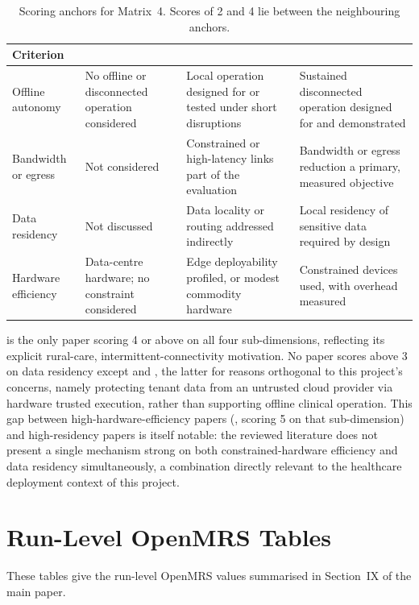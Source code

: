 \documentclass[10pt]{article}
\begin{document}
\begin{table}[t]
\centering
\caption{Scoring anchors for Matrix~4. Scores of 2 and 4 lie between the neighbouring anchors.\label{tab:matrix4-rubric}}
\footnotesize
\setlength{\tabcolsep}{3pt}
\begin{tabular}{@{}>{\RaggedRight\arraybackslash}p{}>{\RaggedRight\arraybackslash}p{}>{\RaggedRight\arraybackslash}p{}>{\RaggedRight\arraybackslash}p{}@{}}
\toprule
Criterion & 1 & 3 & 5 \\
\midrule
Offline autonomy & No offline or disconnected operation considered & Local operation designed for or tested under short disruptions & Sustained disconnected operation designed for and demonstrated \\
Bandwidth or egress & Not considered & Constrained or high-latency links part of the evaluation & Bandwidth or egress reduction a primary, measured objective \\
Data residency & Not discussed & Data locality or routing addressed indirectly & Local residency of sensitive data required by design \\
Hardware efficiency & Data-centre hardware; no constraint considered & Edge deployability profiled, or modest commodity hardware & Constrained devices used, with overhead measured \\
\bottomrule
\end{tabular}
\end{table}

\cite{rodriguez2026arapo} is the only paper scoring 4 or above on all four
sub-dimensions, reflecting its explicit rural-care,
intermittent-connectivity motivation. No paper scores above 3 on
data residency except \cite{rodriguez2026arapo} and
\cite{li2026pyramid}, the latter for reasons orthogonal to this
project's concerns, namely protecting tenant data from an untrusted
cloud provider via hardware trusted execution, rather than supporting offline clinical operation. This gap between
high-hardware-efficiency papers (\cite{kwon2026erpf}, scoring 5 on that sub-dimension) and
high-residency papers is itself notable: the reviewed literature does
not present a single mechanism strong on both constrained-hardware
efficiency and data residency simultaneously, a combination directly
relevant to the healthcare deployment context of this project.




\clearpage
\section{Run-Level OpenMRS Tables}
These tables give the run-level OpenMRS values summarised in Section~IX of the main paper.
\end{document}
